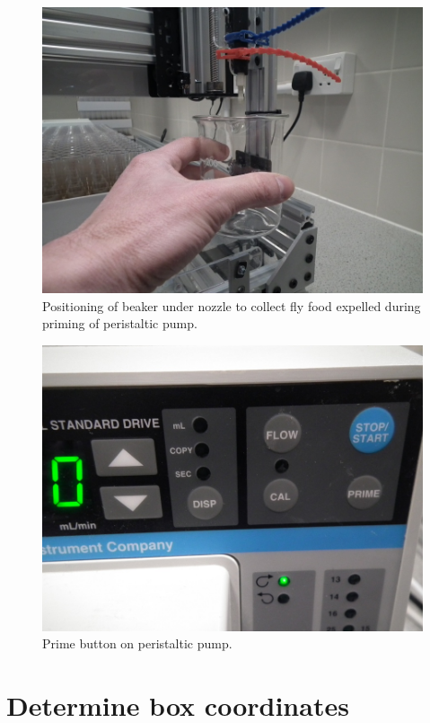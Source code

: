 \documentclass[]{book}
\theoremstyle{definition}
\theoremstyle{definition}
\theoremstyle{remark}
\begin{document}
\begin{figure}

{\centering \includegraphics[width=0.75\linewidth]{images/prime_beaker} 

}

\caption{Positioning of beaker under nozzle to collect fly food expelled during priming of peristaltic pump.}\label{fig:primeBeaker}
\end{figure}

\begin{figure}

{\centering \includegraphics[width=0.75\linewidth]{images/prime_button} 

}

\caption{Prime button on peristaltic pump.}\label{fig:primeButton}
\end{figure}

\section{Determine box coordinates}\label{boxCoordinates}
\end{document}
